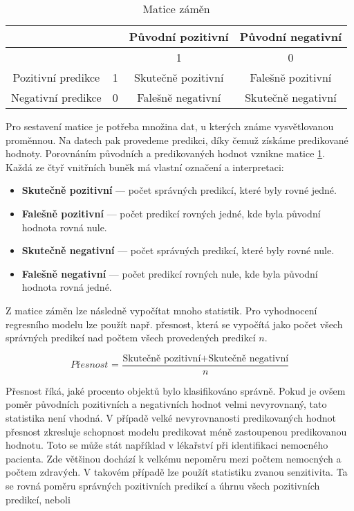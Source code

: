 \begin{table}[H]
    \centering
    \begin{tabular}{|c|c|c|c|}
        \hline
                           &   & Původní pozitivní   & Původní negativní    \\ \hline
                           &   & 1                  & 0                  \\ \hline
        Pozitivní predikce & 1 & Skutečně pozitivní & Falešně pozitivní  \\ \hline
        Negativní predikce & 0 & Falešně negativní  & Skutečně negativní \\ \hline
    \end{tabular}
    \caption{\label{tab:matice_zamen}Matice záměn}
\end{table}

Pro sestavení matice je potřeba množina dat, u kterých známe vysvětlovanou proměnnou. Na datech pak provedeme predikci, díky čemuž získáme predikované hodnoty. Porovnáním
původních a predikovaných hodnot vznikne matice \ref{tab:matice_zamen}. Každá ze čtyř vnitřních buněk má vlastní označení a interpretaci:

\begin{itemize}
    \item \textbf{Skutečně pozitivní} --- počet správných predikcí, které byly rovné jedné.
    \item \textbf{Falešně pozitivní} --- počet predikcí rovných jedné, kde byla původní hodnota rovná nule.
    \item \textbf{Skutečně negativní} --- počet správných predikcí, které byly rovné nule.
    \item \textbf{Falešně negativní} --- počet predikcí rovných nule, kde byla původní hodnota rovná jedné.
\end{itemize}

Z matice záměn lze následně vypočítat mnoho statistik. Pro vyhodnocení regresního modelu lze použít např. přesnost, která se vypočítá jako počet všech správných predikcí nad
počtem všech provedených predikcí $n$.

\begin{equation*}
    \textit{Přesnost = } \frac{\text{Skutečně pozitivní} + \text{Skutečně negativní}}{n}
\end{equation*}


Přesnost říká, jaké procento objektů bylo klasifikováno správně. Pokud je ovšem poměr původních pozitivních a negativních hodnot velmi nevyrovnaný,
tato statistika není vhodná. V případě velké nevyrovnanosti predikovaných hodnot přesnost zkresluje schopnost modelu predikovat méně zastoupenou predikovanou hodnotu. 
Toto se může stát například v lékařství při identifikaci nemocného pacienta. Zde většinou dochází k velkému nepoměru mezi počtem nemocných a počtem zdravých.
V takovém případě lze použít statistiku zvanou senzitivita. Ta se rovná poměru správných pozitivních predikcí a úhrnu všech pozitivních predikcí, neboli

